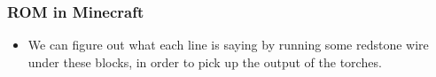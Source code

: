 \documentclass{beamer}
\begin{document}
\begin{frame}
{\begin{tikzpicture}[x=0.75pt,y=0.75pt,yscale=-1,xscale=1]
\end{tikzpicture}

             	}
             \end{frame}
             
             \begin{frame}
             	\frametitle{ROM in Minecraft}
             	\begin{itemize}
             		\item We can figure out what each line is saying by running some redstone wire under these blocks, in order to pick up the output of the torches.
             	\end{itemize}
             	
             	{
             	\centering
             	


\begin{tikzpicture}[x=0.75pt,y=0.75pt,yscale=-1,xscale=1]


\end{tikzpicture}}
\end{frame}
\end{document}
